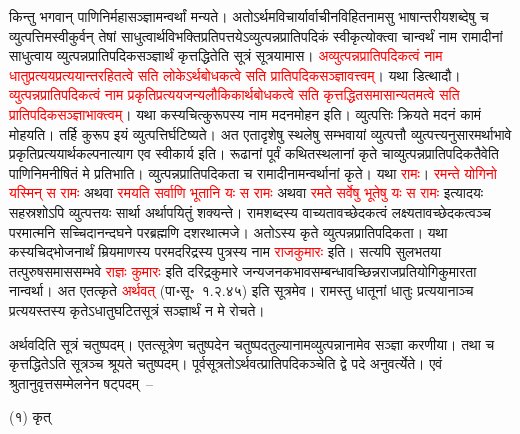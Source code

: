 \begin{sloppypar}\justifying\noindent किन्तु भगवान् पाणिनिर्महा\-सञ्ज्ञामन्वर्थां मन्यते। अतोऽर्थमविचार्यार्वाचीन\-विहित\-नामसु भाषान्तरीय\-शब्देषु च व्युत्पत्तिमस्वीकुर्वन् तेषां साधुत्वार्थ\-विभक्ति\-प्रतिपत्तयेऽव्युत्पन्न\-प्रातिपदिकं स्वीकृत्योक्त्वा चान्वर्थं नाम रामादीनां साधुत्वाय व्युत्पन्न\-प्रातिपदिक\-सञ्ज्ञार्थं कृत्तद्धितेति सूत्रं सूत्रयामास। \textcolor{red}{अव्युत्पन्न\-प्रातिपदिकत्वं नाम धातु\-प्रत्यय\-प्रत्ययान्त\-रहितत्वे सति लोकेऽर्थ\-बोधकत्वे सति प्रातिपदिक\-सञ्ज्ञावत्त्वम्}। यथा डित्थादौ। \textcolor{red}{व्युत्पन्न\-प्रातिपदिकत्वं नाम प्रकृति\-प्रत्यय\-जन्य\-लौकिकार्थ\-बोधकत्वे सति कृत्तद्धित\-समासान्यतमत्वे सति प्रातिपदिक\-सञ्ज्ञा\-भाक्त्वम्}। यथा कस्यचित्कुरूपस्य नाम मदन\-मोहन इति। व्युत्पत्तिः क्रियते मदनं कामं मोहयति। तर्हि कुरूप इयं व्युत्पत्तिर्घटिष्यते। अत एतादृशेषु स्थलेषु सम्भवायां व्युत्पत्तौ व्युत्पत्त्यनुसारमर्थाभावे प्रकृति\-प्रत्ययार्थ\-कल्पना\-त्याग एव स्वीकार्य इति। रूढानां पूर्वं कथित\-स्थलानां कृते चाव्युत्पन्न\-प्रातिपदिकतैवेति पाणिनि\-मनीषितं मे प्रतिभाति। व्युत्पन्न\-प्रातिपदिकता च रामादीनामन्वर्थानां कृते। यथा \textcolor{red}{रामः}। \textcolor{red}{रमन्ते योगिनो यस्मिन् स रामः} अथवा \textcolor{red}{रमयति सर्वाणि भूतानि यः स रामः} अथवा \textcolor{red}{रमते सर्वेषु भूतेषु यः स रामः} इत्यादयः सहस्रशोऽपि व्युत्पत्तयः सार्था अर्थापयितुं शक्यन्ते। राम\-शब्दस्य वाच्यतावच्छेदकत्वं लक्ष्यतावच्छेदकत्वञ्च परमात्मनि सच्चिदानन्द\-घने पर\-ब्रह्मणि दशरथात्मजे। अतोऽस्य कृते व्युत्पन्न\-प्रातिपदिकता। यथा कस्यचिद्भोजनार्थं म्रियमाणस्य परम\-दरिद्रस्य पुत्रस्य नाम \textcolor{red}{राज\-कुमारः} इति। सत्यपि सुलभतया तत्पुरुष\-समास\-सम्भवे \textcolor{red}{राज्ञः कुमारः} इति दरिद्र\-कुमारे जन्य\-जनक\-भाव\-सम्बन्धावच्छिन्न\-राज\-प्रतियोगि\-कुमारता नान्वर्था। अत एतत्कृते \textcolor{red}{अर्थवत्} (पा॰सू॰~१.२.४५) इति सूत्रमेव। रामस्तु धातूनां धातुः प्रत्ययानाञ्च प्रत्ययस्तस्य कृतेऽधातु\-घटित\-सूत्रं सञ्ज्ञार्थं न मे रोचते।\end{sloppypar}
\begin{sloppypar}\justifying\noindent\hspace{10mm} अर्थवदिति सूत्रं चतुष्पदम्। एतत्सूत्रेण चतुष्पदेन चतुष्पद\-तुल्यानामव्युत्पन्नानामेव सञ्ज्ञा करणीया। तथा च कृत्तद्धितेऽति सूत्रञ्च श्रूयते चतुष्पदम्। पूर्व\-सूत्रतोऽर्थवत्प्रातिपदिकञ्चेति द्वे पदे अनुवर्त्येते। एवं श्रुतानुवृत्त\-सम्मेलनेन षट्पदम्~–\end{sloppypar}
\begin{sloppypar}\justifying\noindent\hspace{10mm} (१) कृत्\end{sloppypar}

